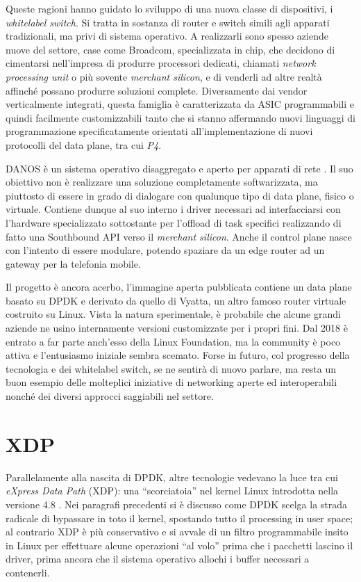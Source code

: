 Queste ragioni hanno guidato lo sviluppo di una nuova classe di dispositivi, i \textit{whitelabel switch}. Si tratta in sostanza di router e switch simili agli apparati tradizionali, ma privi di sistema operativo. A realizzarli sono spesso aziende nuove del settore, case come Broadcom, specializzata in chip, che decidono di cimentarsi nell'impresa di produrre processori dedicati, chiamati \textit{network processing unit} o più sovente \textit{merchant silicon}, e di venderli ad altre realtà affinché possano produrre soluzioni complete. Diversamente dai vendor verticalmente integrati, questa famiglia è caratterizzata da ASIC programmabili e quindi facilmente customizzabili tanto che si stanno affermando nuovi linguaggi di programmazione specificatamente orientati all'implementazione di nuovi protocolli del data plane, tra cui \textit{P4}.

DANOS è un sistema operativo disaggregato e aperto per apparati di rete \cite{danos-whitepaper}. Il suo obiettivo non è realizzare una soluzione completamente softwarizzata, ma piuttosto di essere in grado di dialogare con qualunque tipo di data plane, fisico o virtuale. Contiene dunque al suo interno i driver necessari ad interfacciarsi con l'hardware specializzato sottostante per l'offload di task specifici realizzando di fatto una Southbound API verso il \textit{merchant silicon}. Anche il control plane nasce con l'intento di essere modulare, potendo spaziare da un edge router ad un gateway per la telefonia mobile.

Il progetto è ancora acerbo, l'immagine aperta pubblicata contiene un data plane basato su DPDK e derivato da quello di Vyatta, un altro famoso router virtuale costruito su Linux. Vista la natura sperimentale, è probabile che alcune grandi aziende ne usino internamente versioni customizzate per i propri fini. Dal 2018 è entrato a far parte anch'esso della Linux Foundation, ma la community è poco attiva e l'entusiasmo iniziale sembra scemato. Forse in futuro, col progresso della tecnologia e dei whitelabel switch, se ne sentirà di nuovo parlare, ma resta un buon esempio delle molteplici iniziative di networking aperte ed interoperabili nonché dei diversi approcci saggiabili nel settore.

\section{XDP}

Parallelamente alla nascita di DPDK, altre tecnologie vedevano la luce tra cui \textit{eXpress Data Path} (XDP): una ``scorciatoia'' nel kernel Linux introdotta nella versione 4.8 \cite{xdp-paper}. Nei paragrafi precedenti si è discusso come DPDK scelga la strada radicale di bypassare in toto il kernel, spostando tutto il processing in user space; al contrario XDP è più conservativo e si avvale di un filtro programmabile insito in Linux per effettuare alcune operazioni ``al volo'' prima che i pacchetti lascino il driver, prima ancora che il sistema operativo allochi i buffer necessari a contenerli.

